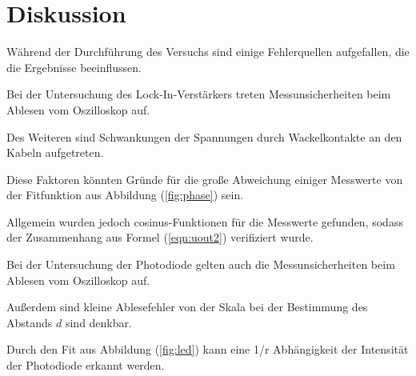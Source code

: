 \newpage
\section{Diskussion}
\label{sec:Diskussion}
Während der Durchführung des Versuchs sind einige Fehlerquellen aufgefallen, die die Ergebnisse beeinflussen.

\noindent
Bei der Untersuchung des Lock-In-Verstärkers treten Messunsicherheiten beim Ablesen vom Oszilloskop auf.

\noindent
Des Weiteren sind Schwankungen der Spannungen durch Wackelkontakte an den Kabeln aufgetreten.

\noindent
Diese Faktoren könnten Gründe für die große Abweichung einiger Messwerte von der Fitfunktion aus Abbildung (\ref{fig:phase}) sein.

\noindent
Allgemein wurden jedoch cosinus-Funktionen für die Messwerte gefunden, sodass der Zusammenhang aus Formel (\ref{eqn:uout2}) verifiziert wurde.

\noindent
Bei der Untersuchung der Photodiode gelten auch die Messunsicherheiten beim Ablesen vom Oszilloskop auf.

\noindent
Außerdem sind kleine Ablesefehler von der Skala bei der Bestimmung des Abstands $d$ sind denkbar.

\noindent
Durch den Fit aus Abbildung (\ref{fig:led}) kann eine 1/r Abhängigkeit der Intensität der Photodiode erkannt werden.
